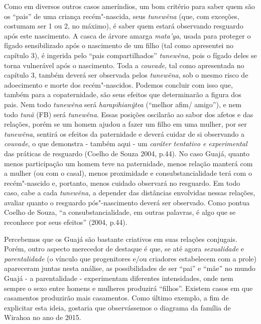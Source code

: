 Como em diversos outros casos ameríndios, um bom critério para saber
quem são os ``pais'' de uma criança recém"-nascida, seus \emph{tunewẽna}
(que, com exceções, costumam ser 1 ou 2, no máximo), é saber quem estará
observando resguardo após este nascimento. A casca de árvore amarga
\emph{mata'ya}, usada para proteger o fígado sensibilizado após o
nascimento de um filho (tal como apresentei no capítulo 3), é ingerida
pelo ``pais compartilhados'' \emph{tunewẽna}, pois o fígado deles se
torna vulnerável após o nascimento. Toda a \emph{couvade}, tal como
apresentada no capítulo 3, também deverá ser observada pelos
\emph{tunewẽna}, sob o mesmo risco de adoecimento e morte dos
recém"-nascidos. Podemos concluir com isso que, também para a
copaternidade, são seus efeitos que determinarão a figura dos pais. Nem
todo \emph{tunewẽna} será \emph{harapihianỹtea} (``melhor afim/
amigo''), e nem todo \emph{tunã} (FB) será \emph{tunewẽna}. Essas
posições oscilarão ao sabor dos afetos e das relações, porém se um homem
ajudou a fazer um filho em uma mulher, por ser \emph{tunewẽna}, sentirá
os efeitos da paternidade e deverá cuidar de si observando a
\emph{couvade}, o que demonstra - também aqui - um \emph{caráter
tentativo e experimental} das práticas de resguardo (Coelho de Souza
2004, p.44). No caso Guajá, quanto menos participação um homem teve na
paternidade, menos relação manterá com a mulher (ou com o casal), menos
proximidade e consubstancialidade terá com o recém"-nascido e, portanto,
menos cuidado observará no resguardo. Em todo caso, cabe a cada
\emph{tunewẽna}, a depender das distâncias envolvidas nessas relações,
avaliar quanto o resguardo pós"-nascimento deverá ser observado. Como
pontua Coelho de Souza, ``a consubstancialidade, em outras palavras, é
algo que se reconhece por seus efeitos'' (2004, p.44).

Percebemos que os Guajá são bastante criativos em suas relações
conjugais. Porém, outro aspecto merecedor de destaque é que, se até
agora \emph{sexualidade} e \emph{parentalidade} (o vínculo que
progenitores e/ou criadores estabelecem com a prole) apareceram juntas
nesta análise, as possibilidades de ser ``pai'' e ``mãe'' no mundo Guajá
- a parentalidade - experimentam diferentes intensidades, onde nem
sempre o sexo entre homens e mulheres produzirá ``filhos''. Existem
casos em que casamentos produzirão mais casamentos. Como último exemplo,
a fim de explicitar esta ideia, gostaria que observássemos o diagrama da
família de Wirahoa no ano de 2015.

